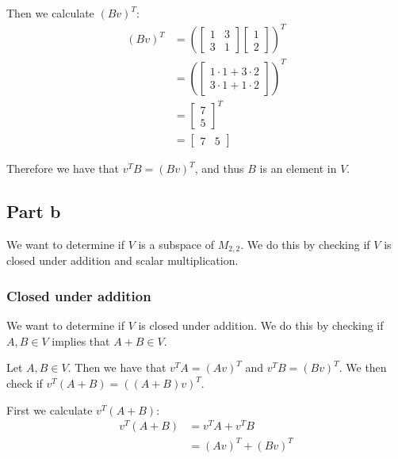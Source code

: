 Then we calculate $(Bv)^T$:
\begin{align*}
	(Bv)^T & = \left(\begin{bmatrix}
		                 1 & 3 \\
		                 3 & 1
	                 \end{bmatrix}
	\begin{bmatrix}
		1 \\
		2
	\end{bmatrix}\right)^T                  \\
	       & = \left(\begin{bmatrix}
		                 1 \cdot 1 + 3 \cdot 2 \\
		                 3 \cdot 1 + 1 \cdot 2
	                 \end{bmatrix}\right)^T \\
	       & = \begin{bmatrix}
		           7 \\
		           5
	           \end{bmatrix}^T              \\
	       & = \begin{bmatrix}
		           7 & 5
	           \end{bmatrix}
\end{align*}

Therefore we have that $v^TB = (Bv)^T$, and thus $B$ is an element in $V$.

\subsection{Part b}
We want to determine if $V$ is a subspace of $M_{2,2}$. We do this by checking if $V$ is closed under addition and scalar multiplication.

\subsubsection{Closed under addition}
We want to determine if $V$ is closed under addition. We do this by checking if $A, B \in V$ implies that $A + B \in V$.

Let $A, B \in V$. Then we have that $v^TA = (Av)^T$ and $v^TB = (Bv)^T$. We then check if $v^T(A + B) = ((A + B)v)^T$.

First we calculate $v^T(A + B)$:
\begin{align*}
	v^T(A + B) & = v^TA + v^TB     \\
	           & = (Av)^T + (Bv)^T
\end{align*}

